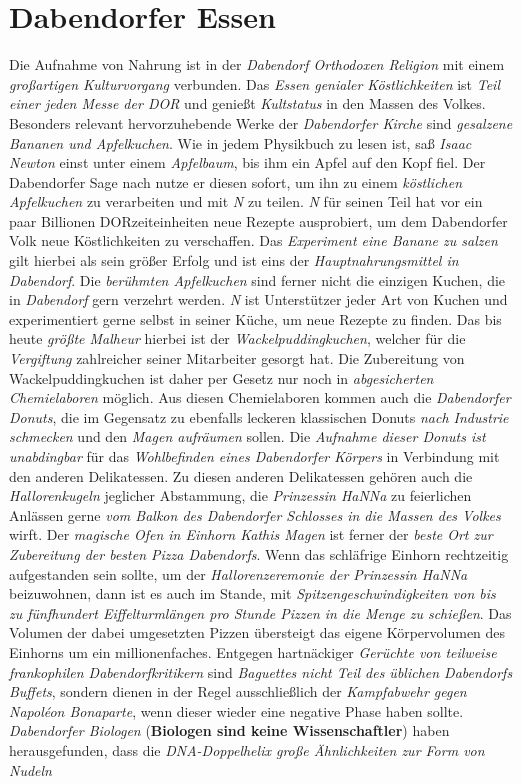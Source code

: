 \section{{Dabendorfer Essen}}
Die Aufnahme von Nahrung ist in der \textit{Dabendorf Orthodoxen Religion} mit einem \textit{großartigen Kulturvorgang} verbunden. Das \textit{Essen genialer Köstlichkeiten} ist \textit{Teil einer jeden Messe der DOR} und genießt \textit{Kultstatus} in den Massen des Volkes. Besonders relevant hervorzuhebende Werke der \textit{Dabendorfer Kirche} sind \textit{gesalzene Bananen und Apfelkuchen}. Wie in jedem Physikbuch zu lesen ist, saß \textit{Isaac Newton} einst unter einem \textit{Apfelbaum}, bis ihm ein Apfel auf den Kopf fiel. Der Dabendorfer Sage nach nutze er diesen sofort, um ihn zu einem \textit{köstlichen Apfelkuchen} zu verarbeiten und mit \textit{N} zu teilen. \textit{N} für seinen Teil hat vor ein paar Billionen DORzeiteinheiten neue Rezepte ausprobiert, um dem Dabendorfer Volk neue Köstlichkeiten zu verschaffen. Das \textit{Experiment eine Banane zu salzen} gilt hierbei als sein größer Erfolg und ist eins der \textit{Hauptnahrungsmittel in Dabendorf}. Die \textit{berühmten Apfelkuchen} sind ferner nicht die einzigen Kuchen, die in \textit{Dabendorf} gern verzehrt werden. \textit{N} ist Unterstützer jeder Art von Kuchen und experimentiert gerne selbst in seiner Küche, um neue Rezepte zu finden. Das bis heute \textit{größte Malheur} hierbei ist der \textit{Wackelpuddingkuchen}, welcher für die \textit{Vergiftung} zahlreicher seiner Mitarbeiter gesorgt hat. Die Zubereitung von Wackelpuddingkuchen ist daher per Gesetz nur noch in \textit{abgesicherten Chemielaboren} möglich. Aus diesen Chemielaboren kommen auch die \textit{Dabendorfer Donuts}, die im Gegensatz zu ebenfalls leckeren klassischen Donuts \textit{nach Industrie schmecken} und den \textit{Magen aufräumen} sollen. Die \textit{Aufnahme dieser Donuts ist unabdingbar} für das \textit{Wohlbefinden eines Dabendorfer Körpers} in Verbindung mit den anderen Delikatessen. Zu diesen anderen Delikatessen gehören auch die \textit{Hallorenkugeln} jeglicher Abstammung, die \textit{Prinzessin HaNNa} zu feierlichen Anlässen gerne \textit{vom Balkon des Dabendorfer Schlosses in die Massen des Volkes} wirft. Der \textit{magische Ofen in Einhorn Kathis Magen} ist ferner der \textit{beste Ort zur Zubereitung der besten Pizza Dabendorfs}. Wenn das schläfrige Einhorn rechtzeitig aufgestanden sein sollte, um der \textit{Hallorenzeremonie der Prinzessin HaNNa} beizuwohnen, dann ist es auch im Stande, mit \textit{Spitzengeschwindigkeiten von bis zu fünfhundert Eiffelturmlängen pro Stunde Pizzen in die Menge zu schießen}. Das Volumen der dabei umgesetzten Pizzen übersteigt das eigene Körpervolumen des Einhorns um ein millionenfaches. Entgegen hartnäckiger \textit{Gerüchte von teilweise frankophilen Dabendorfkritikern} sind \textit{Baguettes nicht Teil des üblichen Dabendorfs Buffets}, sondern dienen in der Regel ausschließlich der \textit{Kampfabwehr gegen Napoléon Bonaparte}, wenn dieser wieder eine negative Phase haben sollte. \textit{Dabendorfer Biologen} (\textbf{Biologen sind keine Wissenschaftler}) haben herausgefunden, dass die \textit{DNA-Doppelhelix große Ähnlichkeiten zur Form von Nudeln} 